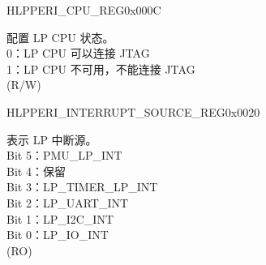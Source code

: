 \begin{register}{H}{LPPERI\_CPU\_REG}{0x000C}\label{regdesc:LPPERICPUREG}
%
%
\regnewline%
\begin{regdesc}\begin{reglist}
\label{fielddesc:LPPERILPCOREDBGMUNAVALIABLE}\item [LPPERI\_LPCORE\_DBGM\_UNAVALIABLE] 配置 LP CPU 状态。\\
0：LP CPU 可以连接 JTAG\\
1：LP CPU 不可用，不能连接 JTAG\\
(R/W)
\end{reglist}\end{regdesc}
\end{register}


\begin{register}{H}{LPPERI\_INTERRUPT\_SOURCE\_REG}{0x0020}\label{regdesc:LPPERIINTERRUPTSOURCEREG}
%
%
\regnewline%
\begin{regdesc}\begin{reglist}
\label{fielddesc:LPPERILPINTERRUPTSOURCE}\item [LPPERI\_LP\_INTERRUPT\_SOURCE] 表示 LP 中断源。\\
Bit 5：PMU\_LP\_INT\\
Bit 4：保留\\
Bit 3：LP\_TIMER\_LP\_INT\\
Bit 2：LP\_UART\_INT\\
Bit 1：LP\_I2C\_INT\\
Bit 0：LP\_IO\_INT\\
(RO)
\end{reglist}\end{regdesc}
\end{register}